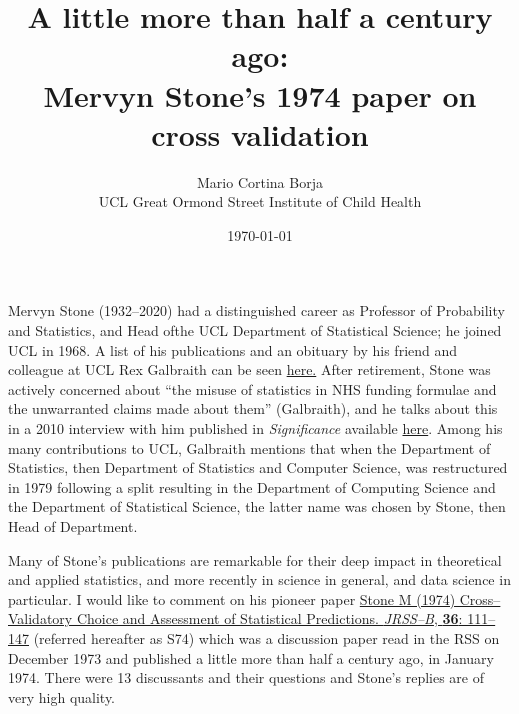 \documentclass[12pt]{article}  %
\title{A little more than half a century ago:\\
Mervyn Stone's 1974 paper on cross validation}
\author{Mario Cortina Borja\\
UCL Great Ormond Street Institute of Child Health}
\date{\today}        %
\begin{document}
\maketitle

 Mervyn Stone (1932--2020) had a distinguished career as Professor of Probability and Statistics, and Head ofthe UCL Department of  Statistical Science; he joined UCL  in 1968.   A list of his publications and an obituary by his friend and colleague at UCL  Rex Galbraith can be seen \href{https://www.ucl.ac.uk/statistics/sites/statistics/files/meryvn-stone-obituary.pdf}{here.}    After retirement, Stone was actively concerned about ``the misuse of statistics in NHS funding formulae and the unwarranted claims made about them'' (Galbraith), and he talks about this in a 2010 interview with him published in \textit{Significance} available \href{https://rss.onlinelibrary.wiley.com/doi/epdf/10.1111/j.1740-9713.2010.00410.x}{here}.   Among his many contributions to UCL,  Galbraith mentions that when the  Department of Statistics, then Department of Statistics and Computer Science, was restructured in 1979 following a split resulting in the Department of Computing Science and the Department of Statistical Science, the latter name was chosen by Stone, then Head of Department.  
 
Many of Stone's publications are remarkable for their deep impact in theoretical and applied statistics, and more recently in science in general, and data science in particular.   
I would like to comment on his pioneer  paper  
\href{https://www.jstor.org/stable/pdf/2984809.pdf?refreqid=fastly-default%3A6cad62e94f9bf73bc0265d3649621bb1&ab_segments=&initiator=&acceptTC=1 }
{ Stone M (1974) Cross--Validatory Choice and Assessment of Statistical Predictions. \textit{JRSS--B}, \textbf{36}: 111--147}  (referred hereafter as S74) which was a discussion paper read in the RSS on December 1973 and published a little more than half a century ago, in January 1974.  There were 13 discussants and their questions and Stone's replies are of very high quality.    
\end{document}
